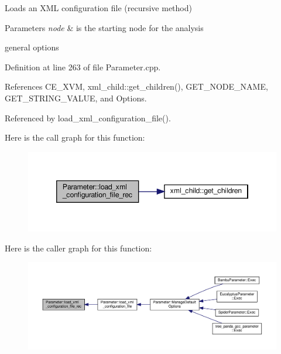 Loads an X\+ML configuration file (recursive method) 


\begin{DoxyParams}{Parameters}
{\em node} & is the starting node for the analysis \\
\hline
\end{DoxyParams}
general options 

Definition at line 263 of file Parameter.\+cpp.



References C\+E\+\_\+\+X\+VM, xml\+\_\+child\+::get\+\_\+children(), G\+E\+T\+\_\+\+N\+O\+D\+E\+\_\+\+N\+A\+ME, G\+E\+T\+\_\+\+S\+T\+R\+I\+N\+G\+\_\+\+V\+A\+L\+UE, and Options.



Referenced by load\+\_\+xml\+\_\+configuration\+\_\+file().

Here is the call graph for this function\+:
\nopagebreak
\begin{figure}[H]
\begin{center}
\leavevmode
\includegraphics[width=346pt]{dc/dab/classParameter_a94dba91fe31d3e03c118b67d2d076120_cgraph}
\end{center}
\end{figure}
Here is the caller graph for this function\+:
\nopagebreak
\begin{figure}[H]
\begin{center}
\leavevmode
\includegraphics[width=350pt]{dc/dab/classParameter_a94dba91fe31d3e03c118b67d2d076120_icgraph}
\end{center}
\end{figure}
\mbox{\label{classParameter_acd65faa4f6d3fef6733d6d8a453854a0}} 
